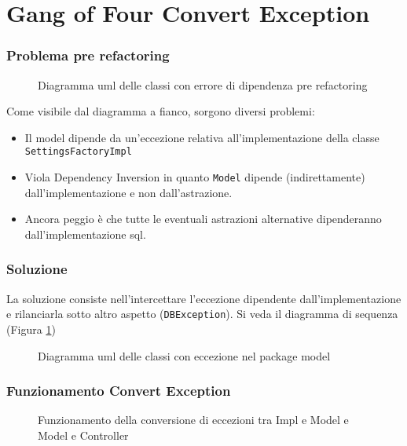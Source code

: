 \section{Gang of Four Convert Exception}
\begin{frame}
    \frametitle{Problema pre refactoring}

    \begin{minipage}{.40\textwidth}
        \begin{figure}
            \centering
            \caption{Diagramma uml delle classi con errore di dipendenza pre refactoring}
        \end{figure}
    \end{minipage}\hfill
    \begin{minipage}{.58\textwidth}
        Come visibile dal diagramma a fianco, sorgono diversi problemi:
        \begin{itemize}
            \item Il model dipende da un'eccezione relativa all'implementazione della classe \texttt{SettingsFactoryImpl}
            \item Viola Dependency Inversion in quanto \texttt{Model} dipende (indirettamente) dall'implementazione e non dall'astrazione.
            \item Ancora peggio è che tutte le eventuali astrazioni alternative dipenderanno dall'implementazione sql.
        \end{itemize}
    \end{minipage}
\end{frame}

\begin{frame}
    \frametitle{Soluzione}

    \begin{minipage}{.40\textwidth}
        La soluzione consiste nell'intercettare l'eccezione dipendente dall'implementazione e rilanciarla sotto altro aspetto (\texttt{DBException}). Si veda il diagramma di sequenza (Figura \ref{uml:act:convex})
    \end{minipage}\hfill
    \begin{minipage}{.58\textwidth}
        \begin{figure}
            \centering
            \caption{Diagramma uml delle classi con eccezione nel package model}
        \end{figure}
    \end{minipage}
\end{frame}

\begin{frame}
    \frametitle{Funzionamento Convert Exception}
    \begin{figure}
        \centering
        \label{uml:act:convex}\caption{Funzionamento della conversione di eccezioni tra Impl e Model e Model e Controller}
    \end{figure}
\end{frame}
